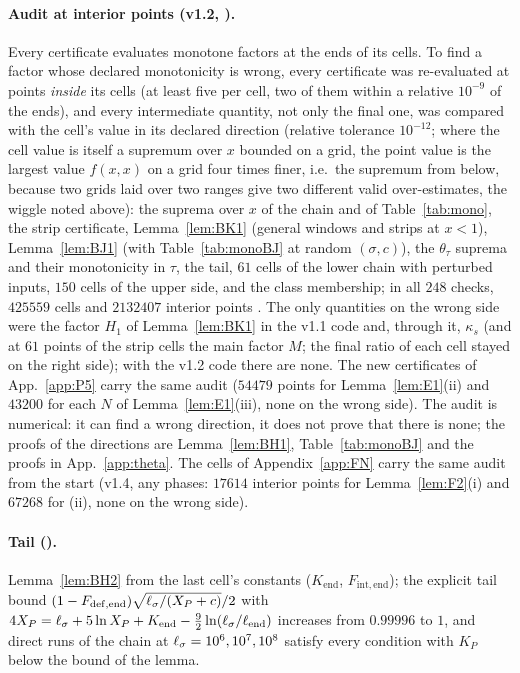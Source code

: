 \paragraph*{Audit at interior points (v1.2, ).}
Every certificate evaluates monotone factors at the ends of its cells. To find a factor whose declared monotonicity is wrong, every certificate was
re-evaluated at points \emph{inside} its cells (at least five per cell, two of them within a relative $10^{-9}$ of the ends), and every intermediate
quantity, not only the final one, was compared with the cell's value in its declared direction (relative tolerance $10^{-12}$; where the cell value
is itself a supremum over $x$ bounded on a grid, the point value is the largest value $f(x,x)$ on a grid four times finer, i.e.\ the supremum from
below, because two grids laid over two ranges give two different valid over-estimates, the wiggle noted above): the suprema over $x$ of
the chain and of Table~\ref{tab:mono}, the strip certificate, Lemma~\ref{lem:BK1} (general windows and strips at $x<1$), Lemma~\ref{lem:BJ1} (with
Table~\ref{tab:monoBJ} at random $(\sigma,c)$), the $\theta_\tau$ suprema and their monotonicity in $\tau$, the tail, $61$ cells of the lower chain with
perturbed inputs, $150$ cells of the upper side, and the class membership; in all $248$ checks, $425559$ cells and $2132407$ interior points
\numst. The only quantities on the wrong side were the factor $H_1$ of Lemma~\ref{lem:BK1} in the v1.1 code and, through it, $\kappa_s$ (and at $61$ points of the
strip cells the main factor $M$; the final ratio of each cell stayed on the right side);
with the v1.2 code there are none. The new certificates of App.~\ref{app:P5} carry the same audit ($54479$ points for Lemma~\ref{lem:E1}(ii) and
$43200$ for each $N$ of Lemma~\ref{lem:E1}(iii), none on the wrong side). The audit is numerical: it can find a wrong direction, it does not prove that
there is none; the proofs of the directions are Lemma~\ref{lem:BH1}, Table~\ref{tab:monoBJ} and the proofs in App.~\ref{app:theta}. The cells of Appendix~\ref{app:FN} carry the same audit from the start (v1.4, any phases: $17614$ interior points for Lemma~\ref{lem:F2}(i) and $67268$ for (ii), none on the wrong side).

\paragraph*{Tail ().}
Lemma~\ref{lem:BH2} from the last cell's constants ($K_{\mathrm{end}}$, $F_{\mathrm{int,end}}$); the explicit tail bound
$(1-F_{\mathrm{def,end}})\sqrt{\ell_\sigma/(X_P+c)}/2$ with $4X_P=\ell_\sigma+5\ln X_P+K_{\mathrm{end}}-\tfrac92\ln(\ell_\sigma/\ell_{\mathrm{end}})$ increases from $0.99996$ to $1$, and direct
runs of the chain at $\ell_\sigma=10^6,10^7,10^8$ satisfy every condition with $K_P$ below the bound of the lemma.

